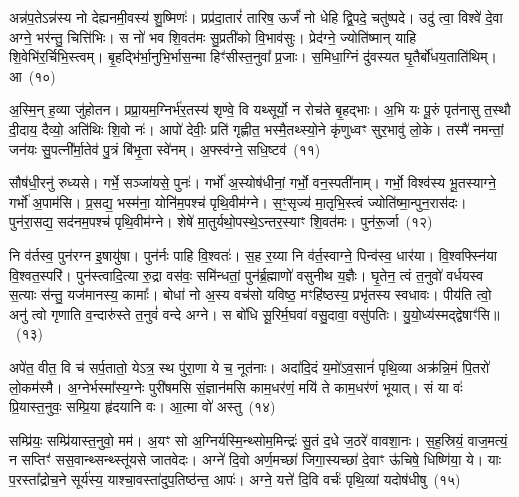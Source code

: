 {\anuvakamend[{तृ॒तीये᳚ त्वा॒ गर्भ॒ आ य॑वि॒ष्ठा यच्च॒त्वारि॑ च}]}%

अन्न॑प॒ते\-ऽन्न॑स्य नो देह्यनमी॒वस्य॑ शु॒ष्मिणः॑। प्रप्र॑दा॒तारं॑ तारिष॒ ऊर्जं॑ नो धेहि द्वि॒पदे॒ चतु॑ष्पदे। उदु॑ त्वा॒ विश्वे॑ दे॒वा अग्ने॒ भर॑न्तु॒ चित्ति॑भिः। स नो॑ भव शि॒वत॑मः सु॒प्रती॑को वि॒भाव॑सुः। प्रेद॑ग्ने॒ ज्योति॑ष्मान् याहि शि॒वेभि॑र॒र्चिभि॒स्त्वम्। बृ॒हद्भि॑र्भा॒नुभि॒र्भास॒न्मा हिꣳ॑सीस्त॒नुवा᳚ प्र॒जाः। स॒मिधा॒ग्निं दु॑वस्यत घृ॒तैर्बो॑धय॒ताति॑थिम्। आ~(१०)

अ॒स्मि॒न् ह॒व्या जु॑होतन। प्रप्रा॒यम॒ग्निर्भ॑र॒तस्य॑ शृण्वे॒ वि यथ्सूर्यो॒ न रोच॑ते बृ॒हद्भाः। अ॒भि यः पू॒रुं पृत॑नासु त॒स्थौ दी॒दाय॒ दैव्यो॒ अति॑थिः शि॒वो नः॑। आपो॑ देवीः॒ प्रति॑ गृह्णीत॒ भस्मै॒तथ्स्यो॒ने कृ॑णुध्वꣳ सुर॒भावु॑ लो॒के। तस्मै॑ नमन्तां॒ जन॑यः सु॒पत्नी᳚र्मा॒तेव॑ पु॒त्रं बि॑भृ॒ता स्वे॑नम्। अ॒फ्स्व॑ग्ने॒ सधि॒ष्टव॑~(११)

सौष॑धी॒रनु॑ रुध्यसे। गर्भे॒ सञ्जा॑यसे॒ पुनः॑। गर्भो॑ अ॒स्योष॑धीनां॒ गर्भो॒ वन॒स्पती॑नाम्। गर्भो॒ विश्व॑स्य भू॒तस्याग्ने॒ गर्भो॑ अ॒पाम॑सि। प्र॒सद्य॒ भस्म॑ना॒ योनि॑म॒पश्च॑ पृथि॒वीम॑ग्ने। स॒ꣳ॒सृज्य॑ मा॒तृभि॒स्त्वं ज्योति॑ष्मा॒न्पुन॒रास॑दः। पुन॑रा॒सद्य॒ सद॑नम॒पश्च॑ पृथि॒वीम॑ग्ने। शेषे॑ मा॒तुर्यथो॒पस्थे॒\-ऽन्तर॒स्याꣳ शि॒वत॑मः। पुन॑रू॒र्जा~(१२)

नि व॑र्तस्व॒ पुन॑रग्न इ॒षायु॑षा। पुन॑र्नः पाहि वि॒श्वतः॑। स॒ह र॒य्या नि व॑र्त॒स्वाग्ने॒ पिन्व॑स्व॒ धार॑या। वि॒श्वफ्स्नि॑या वि॒श्वत॒स्परि॑। पुन॑स्त्वादि॒त्या रु॒द्रा वस॑वः॒ समि॑न्धतां॒ पुन॑र्ब्र॒ह्माणो॑ वसुनीथ य॒ज्ञैः। घृ॒तेन॒ त्वं त॒नुवो॑ वर्धयस्व स॒त्याः स॑न्तु॒ यज॑मानस्य॒ कामाः᳚। बोधा॑ नो अ॒स्य वच॑सो यविष्ठ॒ मꣳहि॑ष्ठस्य॒ प्रभृ॑तस्य स्वधावः। पीय॑ति त्वो॒ अनु॑ त्वो गृणाति व॒न्दारु॑स्ते त॒नुवं॑ वन्दे अग्ने। स बो॑धि सू॒रिर्म॒घवा॑ वसु॒दावा॒ वसु॑पतिः। यु॒यो॒ध्य॑स्मद्द्वेषाꣳ॑सि॥~(१३)

{\anuvakamend[{आ तवो॒र्जा\-ऽनु॒ षोड॑श च}]}%

अपे॑त॒ वीत॒ वि च॑ सर्प॒तातो॒ ये\-ऽत्र॒ स्थ पु॑रा॒णा ये च॒ नूत॑नाः। अदा॑दि॒दं य॒मो॑\-ऽव॒सानं॑ पृथि॒व्या अक्र॑न्नि॒मं पि॒तरो॑ लो॒कम॑स्मै। अ॒ग्नेर्भस्मा᳚स्य॒ग्नेः पुरी॑षमसि सं॒ज्ञान॑मसि काम॒धर॑णं॒ मयि॑ ते काम॒धर॑णं भूयात्। सं या वः॑ प्रि॒यास्त॒नुवः॒ सम्प्रि॒या हृ॑दयानि वः। आ॒त्मा वो॑ अस्तु~(१४)

सम्प्रि॑यः॒ सम्प्रि॑यास्त॒नुवो॒ मम॑। अ॒यꣳ सो अ॒ग्निर्यस्मि॒न्थ्सोम॒मिन्द्रः॑ सु॒तं द॒धे ज॒ठरे॑ वावशा॒नः। स॒ह॒स्रियं॒ वाज॒मत्यं॒ न सप्तिꣳ॑ सस॒वान्थ्सन्थ्स्तू॑यसे जातवेदः। अग्ने॑ दि॒वो अर्ण॒मच्छा॑ जिगा॒स्यच्छा॑ दे॒वाꣳ ऊ॑चिषे॒ धिष्णि॑या॒ ये। याः प॒रस्ता᳚द्रोच॒ने सूर्य॑स्य॒ याश्चा॒वस्ता॑दुप॒तिष्ठ॑न्त॒ आपः॑। अग्ने॒ यत्ते॑ दि॒वि वर्चः॑ पृथि॒व्यां यदोष॑धीषु~(१५)

